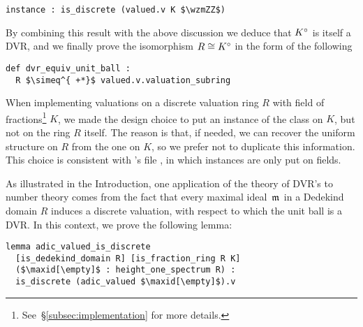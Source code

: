 \documentclass[sigplan,screen]{acmart}
\begin{document}
\begin{lstlisting}[caption={The valuation on a DVR is discrete.}, label={code:discrete_on_DVR}]
instance : is_discrete (valued.v K $\wzmZZ$)
\end{lstlisting}
By combining this result with the above discussion we deduce that ${K}^\circ$ is itself a DVR, and we finally prove the isomorphism $R\cong{K}^\circ$ in the form of the following\href{https://github.com/mariainesdff/local_fields_journal/blob/7ac213eb804fe7945468023527a0fe26ab23b3c8/src/discrete_valuation_ring/basic.lean#L522}{\extlink} 
\begin{lstlisting}
def dvr_equiv_unit_ball : 
  R $\simeq^{ +*}$ valued.v.valuation_subring
\end{lstlisting}

\begin{remark}
When implementing valuations on a discrete valuation ring $R$ with field of fractions\footnote{See~\S\ref{subsec:implementation} for more details.} $K$, we made the design choice to put an instance of the  class on $K$, but not on the ring $R$ itself. The reason is that, if needed, we can recover the
uniform structure on $R$ from the one on $K$, so we prefer not to duplicate this information. This choice is consistent with \mathlib's file \href{https://leanprover-community.github.io/mathlib_docs/ring_theory/dedekind_domain/adic_valuation.html}{\extlink}, in which  instances are only put on fields.
\end{remark}

As illustrated in the Introduction, one application of the theory of DVR's to number theory comes from the fact that every maximal ideal~$\maxid[\empty]$ in a Dedekind domain $R$ induces a discrete valuation, with respect to which the unit ball is a DVR. In this context, we prove the following lemma:\href{https://github.com/mariainesdff/local_fields_journal/blob/7ac213eb804fe7945468023527a0fe26ab23b3c8/src/discrete_valuation_ring/global_to_local.lean#L28}{\extlink}
\begin{lstlisting}
lemma adic_valued_is_discrete
  [is_dedekind_domain R] [is_fraction_ring R K]
  ($\maxid[\empty]$ : height_one_spectrum R) :
  is_discrete (adic_valued $\maxid[\empty]$).v
\end{lstlisting}

\end{document}
